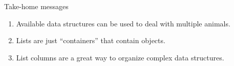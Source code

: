\documentclass[ignorenonframetext,,t]{beamer}
\providecommand{\tightlist}{%
\setlength{\itemsep}{0pt}\setlength{\parskip}{0pt}}
\providecommand{\tightlist}{%
\setlength{\itemsep}{0pt}\setlength{\parskip}{0pt}}
\renewcommand{\tightlist}{\setlength{\itemsep}{1.4ex}\setlength{\parskip}{0pt}}
\begin{document}
\begin{frame}{Take-home messages}
\protect\hypertarget{take-home-messages}{}
\begin{enumerate}
\tightlist
\item
  Available data structures can be used to deal with multiple animals.
\item
  Lists are just ``containers'' that contain objects.
\item
  List columns are a great way to organize complex data structures.
\end{enumerate}
\end{frame}
\end{document}
